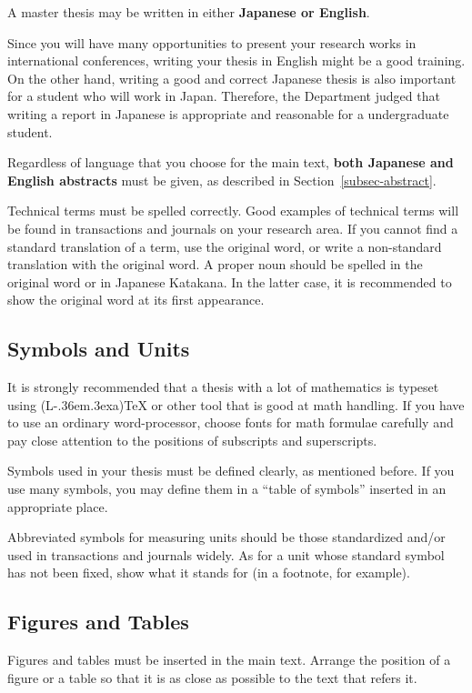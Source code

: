 \documentclass[master,english]{kuisthesis}
\def\LATEX{{\rm (L\kern-.36em\raise.3ex\hbox{\sc a})\TeX}}
\let\EM\bf
\begin{document}
A master thesis may be written in either {\EM Japanese or English}.

Since you will have many opportunities to present your research works in
international conferences, writing your thesis in English might be a good
training.  On the other hand, writing a good and correct Japanese thesis is
also important for a student who will work in Japan.  Therefore, the
Department judged that writing a report in Japanese is appropriate and
reasonable for a undergraduate student.

Regardless of language that you choose for the main text, {\EM both
Japanese and English abstracts} must be given, as described in
Section~\ref{subsec-abstract}.

Technical terms must be spelled correctly.  Good examples of technical terms
will be found in transactions and journals on your research area.  If you
cannot find a standard translation of a term, use the original word, or
write a non-standard translation with the original word.  A proper noun
should be spelled in the original word or in Japanese Katakana.  In the
latter case, it is recommended to show the original word at its first
appearance.

\subsection{Symbols and Units}\label{subsec-symbol}
It is strongly recommended that a thesis with a lot of mathematics is
typeset using \LATEX{} or other tool that is good at math handling.  If
you have to use an ordinary word-processor, choose fonts for math formulae
carefully and pay close attention to the positions of subscripts and
superscripts.

Symbols used in your thesis must be defined clearly, as mentioned before.
If you use many symbols, you may define them in a ``table of symbols''
inserted in an appropriate place.

Abbreviated symbols for measuring units should be those standardized
and\slash or used in transactions and journals widely.  As for a unit whose
standard symbol has not been fixed, show what it stands for (in a footnote,
for example).

\subsection{Figures and Tables}\label{subsec-figure}
Figures and tables must be inserted in the main text.  Arrange the position
of a figure or a table so that it is as close as possible to the text that
refers it.
\end{document}
